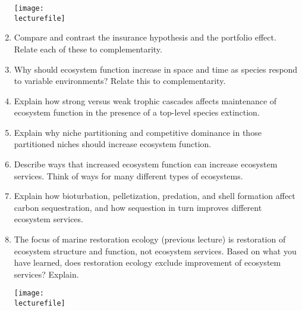 \documentclass[letterpaper]{tufte-handout}
\newcommand\lecturefile{434_lecture05_instructor}
\begin{document}
\begin{enumerate}
	\begin{marginfigure}
		\texttt{[image: \\lecturefile]}
	\end{marginfigure}

	\item Compare and contrast the insurance hypothesis and the portfolio effect. Relate each of these to complementarity.
	
	\item Why should ecosystem function increase in space and time as species respond to variable environments? Relate this to complementarity.

	\item Explain how strong versus weak trophic cascades affects maintenance of ecosystem function in the presence of a top-level species extinction.
	
	\item Explain why niche partitioning and competitive dominance in those partitioned niches should increase ecosystem function.
	
	\item Describe ways that increased ecosystem function can increase ecosystem services. Think of ways for many different types of ecosystems.
	
	\item Explain how bioturbation, pelletization, predation, and shell formation affect carbon sequestration, and how sequestion in turn improves different ecosystem services.
	
	\item The focus of marine restoration ecology (previous lecture) is restoration of ecosystem structure and function, not ecosystem services. Based on what you have learned, does restoration ecology exclude improvement of ecosystem services?  Explain.
	
	\begin{marginfigure}
		\texttt{[image: \\lecturefile]}
	\end{marginfigure}
		
\end{enumerate}
\end{document}
